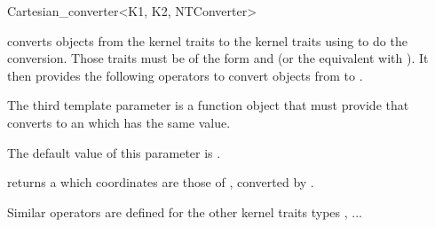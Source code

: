 \begin{ccRefClass}{Cartesian_converter<K1, K2, NTConverter>}

\KernelRefLayout\gdef\ccTagOperatorLayout{\ccFalse}

\ccDefinition

\ccClassTemplateName converts objects from the kernel traits  to
the kernel traits  using  to do the conversion.  
Those traits must be of the form
 and  (or the equivalent with
).  It then provides the following operators to convert
objects from  to .

The third template parameter  is a function object that must
provide  that converts  to an
 which has the same value.

The default value of this parameter is .


\ccCreation
{}


\ccOperations

{ returns a  which coordinates are those of ,
converted by .}

Similar operators are defined for the other kernel traits types ,
...

\ccSeeAlso
{} \\
 \\

\end{ccRefClass}
